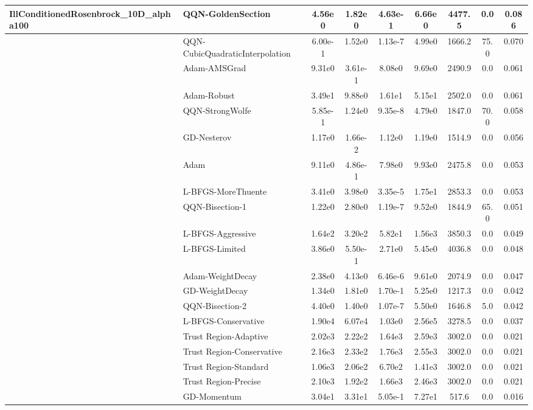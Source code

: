 \documentclass{article}
\begin{document}
\begin{longtable}{|l|l|c|c|c|c|c|c|c|}
IllConditionedRosenbrock\_10D\_alpha100 & \textbf{QQN-GoldenSection} & 4.56e0 & 1.82e0 & 4.63e-1 & 6.66e0 & 4477.5 & 0.0 & 0.086 \\
\hline
 & QQN-CubicQuadraticInterpolation & 6.00e-1 & 1.52e0 & 1.13e-7 & 4.99e0 & 1666.2 & 75.0 & 0.070 \\
\hline
 & Adam-AMSGrad & 9.31e0 & 3.61e-1 & 8.08e0 & 9.69e0 & 2490.9 & 0.0 & 0.061 \\
\hline
 & Adam-Robust & 3.49e1 & 9.88e0 & 1.61e1 & 5.15e1 & 2502.0 & 0.0 & 0.061 \\
\hline
 & QQN-StrongWolfe & 5.85e-1 & 1.24e0 & 9.35e-8 & 4.79e0 & 1847.0 & 70.0 & 0.058 \\
\hline
 & GD-Nesterov & 1.17e0 & 1.66e-2 & 1.12e0 & 1.19e0 & 1514.9 & 0.0 & 0.056 \\
\hline
 & Adam & 9.11e0 & 4.86e-1 & 7.98e0 & 9.93e0 & 2475.8 & 0.0 & 0.053 \\
\hline
 & L-BFGS-MoreThuente & 3.41e0 & 3.98e0 & 3.35e-5 & 1.75e1 & 2853.3 & 0.0 & 0.053 \\
\hline
 & QQN-Bisection-1 & 1.22e0 & 2.80e0 & 1.19e-7 & 9.52e0 & 1844.9 & 65.0 & 0.051 \\
\hline
 & L-BFGS-Aggressive & 1.64e2 & 3.20e2 & 5.82e1 & 1.56e3 & 3850.3 & 0.0 & 0.049 \\
\hline
 & L-BFGS-Limited & 3.86e0 & 5.50e-1 & 2.71e0 & 5.45e0 & 4036.8 & 0.0 & 0.048 \\
\hline
 & Adam-WeightDecay & 2.38e0 & 4.13e0 & 6.46e-6 & 9.61e0 & 2074.9 & 0.0 & 0.047 \\
\hline
 & GD-WeightDecay & 1.34e0 & 1.81e0 & 1.70e-1 & 5.25e0 & 1217.3 & 0.0 & 0.042 \\
\hline
 & QQN-Bisection-2 & 4.40e0 & 1.40e0 & 1.07e-7 & 5.50e0 & 1646.8 & 5.0 & 0.042 \\
\hline
 & L-BFGS-Conservative & 1.90e4 & 6.07e4 & 1.03e0 & 2.56e5 & 3278.5 & 0.0 & 0.037 \\
\hline
 & Trust Region-Adaptive & 2.02e3 & 2.22e2 & 1.64e3 & 2.59e3 & 3002.0 & 0.0 & 0.021 \\
\hline
 & Trust Region-Conservative & 2.16e3 & 2.33e2 & 1.76e3 & 2.55e3 & 3002.0 & 0.0 & 0.021 \\
\hline
 & Trust Region-Standard & 1.06e3 & 2.06e2 & 6.70e2 & 1.41e3 & 3002.0 & 0.0 & 0.021 \\
\hline
 & Trust Region-Precise & 2.10e3 & 1.92e2 & 1.66e3 & 2.46e3 & 3002.0 & 0.0 & 0.021 \\
\hline
 & GD-Momentum & 3.04e1 & 3.31e1 & 5.05e-1 & 7.27e1 & 517.6 & 0.0 & 0.016 \\

\end{longtable}
\end{document}
